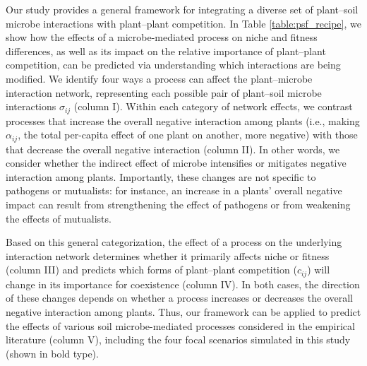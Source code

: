 Our study provides a general framework for integrating a diverse set of plant--soil microbe interactions with plant--plant competition. In Table \ref{table:psf_recipe}, we show how the effects of a microbe-mediated process on niche and fitness differences, as well as its impact on the relative importance of plant--plant competition, can be predicted via understanding which interactions are being modified.
We identify four ways a process can affect the plant--microbe interaction network, representing each possible pair of plant--soil microbe interactions $\sigma_{ij}$ (column I). Within each category of network effects, we contrast processes that increase the overall negative interaction among plants (i.e., making $\alpha_{ij}$, the total per-capita effect of one plant on another, more negative) with those that decrease the overall negative interaction (column II). In other words, we consider whether the indirect effect of microbe intensifies or mitigates negative interaction among plants. Importantly, these changes are not specific to pathogens or mutualists: for instance, an increase in a plants' overall negative impact can result from strengthening the effect of pathogens or from weakening the effects of mutualists.
\par


Based on this general categorization, the effect of a process on the underlying interaction network determines whether it primarily affects niche or fitness (column III) and predicts which forms of plant--plant competition ($c_{ij}$) will change in its importance for coexistence (column IV). In both cases, the direction of these changes depends on whether a process increases or decreases the overall negative interaction among plants. Thus, our framework can be applied to predict the effects of various soil microbe-mediated processes considered in the empirical literature (column V), including the four focal scenarios simulated in this study (shown in bold type).
\par



